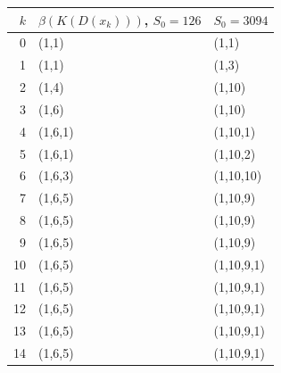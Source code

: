 \begin{tabular}{@{}rll@{}}\toprule $k$ & $\beta(K(D(x_k)))$, $S_0=126$ & $S_0=3094$\\\midrule
0 & (1,1) & (1,1)\\
1 & (1,1) & (1,3)\\
2 & (1,4) & (1,10)\\
3 & (1,6) & (1,10)\\
4 & (1,6,1) & (1,10,1)\\
5 & (1,6,1) & (1,10,2)\\
6 & (1,6,3) & (1,10,10)\\
7 & (1,6,5) & (1,10,9)\\
8 & (1,6,5) & (1,10,9)\\
9 & (1,6,5) & (1,10,9)\\
10 & (1,6,5) & (1,10,9,1)\\
11 & (1,6,5) & (1,10,9,1)\\
12 & (1,6,5) & (1,10,9,1)\\
13 & (1,6,5) & (1,10,9,1)\\
14 & (1,6,5) & (1,10,9,1)\\
\bottomrule\end{tabular}
